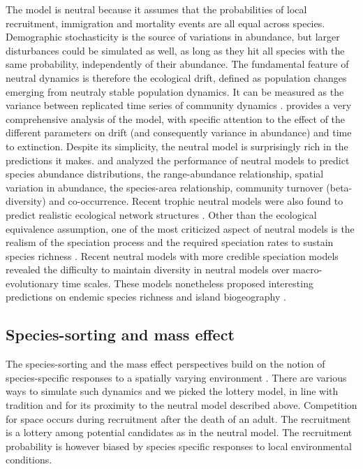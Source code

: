 \documentclass[12pt]{article}
\begin{document}
The model is neutral because it assumes that the probabilities of local
recruitment, immigration and mortality events are all equal across species.
Demographic stochasticity is the source of variations in abundance, but larger
disturbances could be simulated as well, as long as they hit all species with
the same probability, independently of their abundance. The fundamental feature of
neutral dynamics is therefore the ecological drift, defined as population
changes emerging from neutraly stable population dynamics. It can be measured as
the variance between replicated time series of community dynamics
\parencite{Gravel2011a}. \textcite{Hubbell2001} provides a very comprehensive
analysis of the model, with specific attention to the effect of the different
parameters on drift (and consequently variance in abundance) and time to
extinction. Despite its simplicity, the neutral model is surprisingly rich in
the predictions it makes. \textcite{Bell2001} and \textcite{Hubbell2001}
analyzed the performance of neutral models to predict species abundance
distributions, the range-abundance relationship, spatial variation in abundance,
the species-area relationship, community turnover (beta-diversity) and
co-occurrence. Recent trophic neutral models were also found to predict realistic ecological
network structures \parencite{Canard2012}. Other than the ecological equivalence
assumption, one of the most criticized aspect of neutral models is the realism
of the speciation process and the required speciation rates to sustain species
richness \parencite{Ricklefs2003,Etienne2007}. Recent neutral models with more
credible speciation models \parencite{Rosindell2009,Desjardins2012a} revealed
the difficulty to maintain diversity in neutral models over macro-evolutionary
time scales. These models nonetheless proposed interesting predictions
on endemic species richness and island biogeography \parencite{Rosindell2011,Desjardins2012b}.

\subsection*{Species-sorting and mass effect}

The species-sorting and the mass effect perspectives build on the notion of
species-specific responses to a spatially varying environment
\parencite{Leibold2004a}. There are various ways to simulate such dynamics and
we picked the lottery model, in line with tradition \parencite{Mouquet2002} and
for its proximity to the neutral model described above. Competition for space
occurs during recruitment after the death of an adult. The recruitment is a
lottery among potential candidates as in the neutral model. The recruitment probability 
is however biased by species specific responses to local environmental conditions. 
\end{document}
